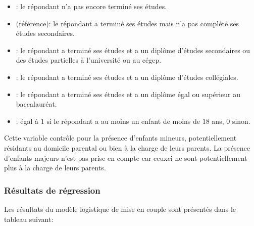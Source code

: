 \documentclass[letterpaper,10pt,french]{sphinxmanual}
\begin{document}
\begin{itemize}
\item {} 
: le répondant n’a pas encore terminé ses études.

\item {} 
 (référence): le répondant a terminé ses études mais n’a pas complété ses études secondaires.

\item {} 
: le répondant a terminé ses études et a un diplôme d’études secondaires ou des études partielles à l’université ou au cégep.

\item {} 
: le répondant a terminé ses études et a un diplôme d’études collégiales.

\item {} 
: le répondant a terminé ses études et a un diplôme égal ou supérieur au baccalauréat.

\end{itemize}

\begin{itemize}
\item {} 
: égal à 1 si le répondant a au moins un enfant de moins de 18 ans, 0 sinon.

\end{itemize}

Cette variable contrôle pour la présence d’enfants mineurs, potentiellement résidants au domicile parental ou bien à la charge de leurs parents. La présence d’enfants majeurs n’est pas prise en compte car ceux\sphinxhyphen{}ci ne sont potentiellement plus à la charge de leurs parents.


\subsubsection{Résultats de régression}
\label{\detokenize{methodologie:id11}}
Les résultats du modèle logistique de mise en couple sont présentés dans le tableau suivant:
\end{document}
